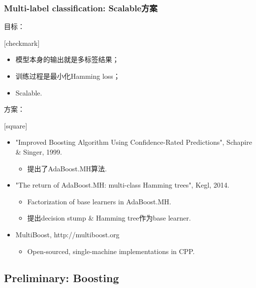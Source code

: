 \documentclass{beamer}
\begin{document}
\begin{frame}
\frametitle{Multi-label classification: Scalable方案}
目标：
  {
    [checkmark]
    \begin{itemize}
      \item 模型本身的输出就是多标签结果；
      \item 训练过程是最小化Hamming loss；
      \item Scalable.
    \end{itemize}
  }
\pause

方案：
  {
    [square]
    \begin{itemize}
      \item {\color{purple} "Improved Boosting Algorithm Using Confidence-Rated Predictions", Schapire \& Singer, 1999.}
      \begin{itemize}
        \item 提出了AdaBoost.MH算法.
      \end{itemize}
      \item {\color{purple} "The return of AdaBoost.MH: multi-class Hamming trees", Kegl, 2014.}
      \begin{itemize}
        \item Factorization of base learners in AdaBoost.MH.
        \item 提出decision stump \& Hamming tree作为base learner.
      \end{itemize}
      \item {\color{purple} MultiBoost, http://multiboost.org}
      \begin{itemize}
        \item Open-sourced, single-machine implementations in CPP.
      \end{itemize}
    \end{itemize}
  }
\end{frame}


\subsection{Preliminary: Boosting}
\end{document}
